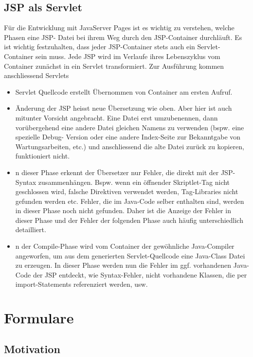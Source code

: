 \documentclass[a4paper,10pt]{scrreprt}
\begin{document}
{\section{JSP als Servlet}
Für die Entwicklung mit JavaServer Pages ist es wichtig zu verstehen, welche Phasen eine JSP-
Datei bei ihrem Weg durch den JSP-Container durchläuft. Es ist wichtig festzuhalten, dass jeder
JSP-Container stets auch ein Servlet-Container sein muss. Jede JSP wird im Verlaufe ihres
Lebenszyklus vom Container zunächst in ein Servlet transformiert. Zur Ausführung kommen
anschliessend Servlets

\begin{itemize}
 \item Servlet Quellcode erstellt
 \subitem Übernommen von Container am ersten Aufruf.
 \item Änderung der JSP heisst neue Übersetzung wie oben.
 \subitem Aber hier ist auch mitunter Vorsicht angebracht. Eine Datei erst umzubenennen, dann
vorübergehend eine andere Datei gleichen Namens zu verwenden (bspw. eine spezielle Debug-
Version oder eine andere Index-Seite zur Bekanntgabe von Wartungsarbeiten, etc.) und
anschliessend die alte Datei zurück zu kopieren, funktioniert nicht.
\item n dieser Phase erkennt der Übersetzer nur Fehler, die
direkt mit der JSP-Syntax zusammenhängen. Bspw. wenn ein öffnender Skriptlet-Tag nicht
geschlossen wird, falsche Direktiven verwendet werden, Tag-Libraries nicht gefunden werden etc.
Fehler, die im Java-Code selber enthalten sind, werden in dieser Phase noch nicht gefunden. Daher
ist die Anzeige der Fehler in dieser Phase und der Fehler der folgenden Phase auch häufig
unterschiedlich detailliert.
\item n der Compile-Phase wird vom Container der gewöhnliche Java-Compiler angeworfen, um aus dem
generierten Servlet-Quellcode eine Java-Class Datei zu erzeugen. In dieser Phase werden nun die
Fehler im ggf. vorhandenen Java-Code der JSP entdeckt, wie Syntax-Fehler, nicht vorhandene
Klassen, die per import-Statements referenziert werden, usw.

\end{itemize}
\chapter{Formulare}

\section{Motivation}

}
\end{document}

